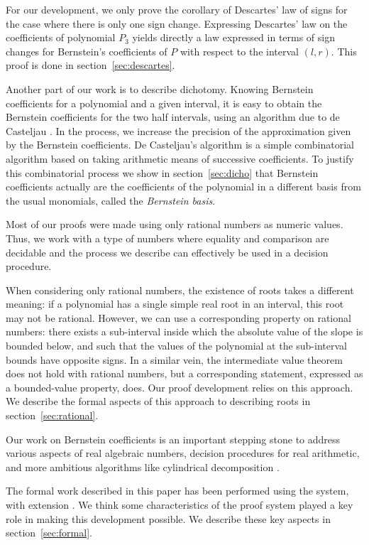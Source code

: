 \documentclass{mscs}
\begin{document}
For our development, we only prove the corollary  of
Descartes' law of signs for the case where there is only one sign
change.  Expressing Descartes' law on the coefficients of polynomial
\(P_3\) yields directly a law expressed in terms of sign changes for
Bernstein's coefficients of \(P\) with respect to the
interval
\((l,r)\).   This proof is done in section~\ref{sec:descartes}.

Another part of our work is to describe dichotomy.  Knowing Bernstein
coefficients for a polynomial and a given interval, it is easy to
obtain the Bernstein coefficients for the two half intervals, using
an algorithm due to de Casteljau \cite{castel}.  In the process, we increase
the precision of the approximation given by the Bernstein
coefficients.  De Casteljau's algorithm is a simple combinatorial
algorithm based on taking arithmetic means of successive coefficients.
To justify this combinatorial process we show in
section~\ref{sec:dicho} that Bernstein
coefficients actually are the coefficients of the polynomial in a
different basis from the usual monomials, called the {\em Bernstein basis}.

Most of our proofs were made using only rational numbers as numeric
values.  Thus, we work with a type of numbers where equality and
comparison are decidable and the process we describe can effectively
be used in a decision procedure.

When considering only rational numbers, the existence of roots takes a
different meaning: if a polynomial has a single simple real root in an
interval, this root may not be rational.  However, we can use a
corresponding property on rational numbers: there exists a
sub-interval inside which the absolute value of the slope is bounded
below, and such that the values of the polynomial at the sub-interval
bounds have opposite signs.  In a similar vein, the intermediate value
theorem does not hold with rational numbers, but a corresponding
statement, expressed as a bounded-value property, does.  Our proof
development relies on this approach.  We describe the formal aspects
of this approach to describing roots in section~\ref{sec:rational}.

Our work on Bernstein coefficients is an important stepping stone
to address various aspects of real algebraic numbers, decision
procedures for real arithmetic, and more ambitious algorithms like
cylindrical decomposition \cite{bpr, cadcoq}.

The formal work described in this paper has been performed using
the \Coq{} system\cite{coqart}, with \ssr{} extension
\cite{GONTHIER:2008:INRIA-00258384:4}.  We think some characteristics
of the proof system played a key role in making this development
possible.  We describe these key aspects in section~\ref{sec:formal}.
\end{document}
